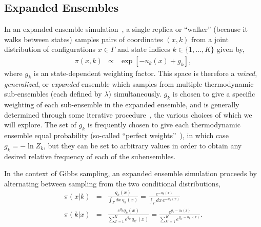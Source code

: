 \documentclass[superscriptaddress,showkeys, nofootinbib, pre, aps]{revtex4-1}
\begin{document}
\subsection{Expanded Ensembles \label{sec:expandedensembles}}

In an expanded ensemble simulation~\cite{lyubartsev:jcp:1992:expanded-ensembles}, a single replica or ``walker'' (because it walks between states) samples pairs of coordinates $(x,k)$ from a joint distribution of configurations $x \in \Gamma$ and state indices $k \in \{1,\ldots,K\}$ given by,
\begin{eqnarray}
\pi(x,k) &\propto& \exp[-u_k(x) + g_k] ,
\end{eqnarray}
where $g_k$ is an state-dependent weighting factor.
This space is therefore a {\em mixed}, {\em generalized}, or {\em expanded} ensemble which samples from multiple thermodynamic sub-ensembles (each defined by $\lambda$) simultaneously.
$g_k$ is chosen to give a specific weighting of each sub-ensemble in the expanded ensemble, and is generally determined
through some iterative procedure~\cite{lyubartsev:jcp:1992:expanded-ensembles,marinari-parisi:europhys-lett:1992:simulated-tempering,wang-landau:prl:2001:wang-landau,park-ensign-pande:pre:2006:bayesian-weight-update,park-pande:pre:2007:choosing-weights-simulated-tempering,li-fajer-yang:jcp:2007:simulated-scaling,chelli:jctc:2010:optimal-weights-expanded-ensembles}, the various choices of which we will explore.
The set of $g_k$ is frequently chosen to give each thermodynamic ensemble equal probability (so-called ``perfect weights''~\cite{park-pande:pre:2007:choosing-weights-simulated-tempering}), in which case $g_k=-\ln Z_k$, but they can be set to arbitrary values in order to obtain any desired relative frequency of each of the subensembles.

In the context of Gibbs sampling, an expanded ensemble simulation proceeds by alternating between sampling from the two conditional distributions,
\begin{eqnarray}
\pi(x | k) &=& \frac{q_k(x)}{\int_\Gamma dx \, q_k(x)} = \frac{e^{-u_k(x)}}{\int_\Gamma dx \, e^{-u_k(x)}} \\
\pi(k | x) &=& \frac{e^{g_k}q_k(x)}{\sum\limits_{k'=1}^K e^{g_{k'}}q_{k'}(x)} = \frac{e^{g_k - u_k(x)}}{\sum\limits_{k'=1}^K e^{g_{k'} - u_{k'}(x)}} .\label{equation:expanded-ensemble-gibbs-update}
\end{eqnarray}
\end{document}
